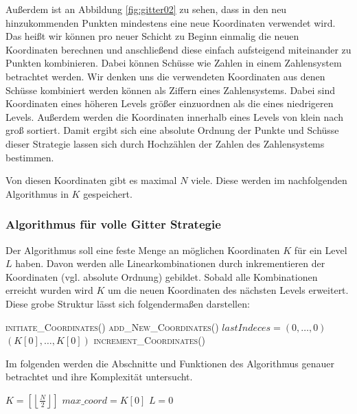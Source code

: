 \documentclass[a4paper,12pt]{llncs}
\numberwithin{equation}{section}
\begin{document}
Außerdem ist an Abbildung \ref{fig:gitter02} zu sehen, dass in den neu hinzukommenden Punkten mindestens eine neue Koordinaten verwendet wird. Das heißt wir können pro neuer Schicht zu Beginn einmalig die neuen Koordinaten berechnen und anschließend diese einfach aufsteigend miteinander zu Punkten kombinieren. Dabei können Schüsse wie Zahlen in einem Zahlensystem betrachtet werden. Wir denken uns die verwendeten Koordinaten aus denen Schüsse kombiniert werden können als Ziffern eines Zahlensystems. Dabei sind Koordinaten eines höheren Levels größer einzuordnen als die eines niedrigeren Levels. Außerdem werden die Koordinaten innerhalb eines Levels von klein nach groß sortiert. Damit ergibt sich eine absolute Ordnung der Punkte und Schüsse dieser Strategie lassen sich durch Hochzählen der Zahlen des Zahlensystems bestimmen.

Von diesen Koordinaten gibt es maximal $N$ viele. Diese werden im nachfolgenden Algorithmus in $K$ gespeichert.

\subsubsection{Algorithmus für volle Gitter Strategie}

Der Algorithmus soll eine feste Menge an möglichen Koordinaten $K$ für ein Level $L$ haben. Davon werden alle Linearkombinationen durch inkrementieren der Koordinaten (vgl. absolute Ordnung) gebildet. Sobald alle Kombinationen erreicht wurden wird $K$ um die neuen Koordinaten des nächsten Levels erweitert. Diese grobe Struktur lässt sich folgendermaßen darstellen:

\begin{tcolorbox}
	\begin{algorithmic}
		\State \textsc{initiate\_Coordinates}()
		\EndIf
		\State \textsc{add\_New\_Coordinates}()
		\EndIf
		\State $lastIndeces = (0,\dots,0)$
		\State \Return $(K[0],\dots,K[0])$
		\Else
		\State \textsc{increment\_Coordinates}()
		\EndIf
		\EndFunction
	\end{algorithmic}
\end{tcolorbox}

Im folgenden werden die Abschnitte und Funktionen des Algorithmus genauer betrachtet und ihre Komplexität untersucht.

\begin{tcolorbox}
	\begin{algorithmic}
		\Function{initiate\_Coordinates}{}{}
		\State $K=\left[\left\lfloor\frac{N}{2}\right\rfloor\right]$
		\State $max\_coord=K\left[0\right]$
		\State $L=0$
		\EndFunction
	\end{algorithmic}
\end{tcolorbox}
\end{document}
